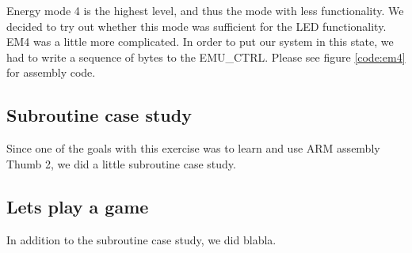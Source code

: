 		Energy mode 4 is the highest level, and thus the mode with less functionality. We decided to try out whether this mode was sufficient for the LED functionality. EM4 was a little more complicated. In order to put our system in this state, we had to write a sequence of bytes to the EMU\_CTRL. Please see figure \ref{code:em4} for assembly code.

	
	\subsection{Subroutine case study}
	Since one of the goals with this exercise was to learn and use ARM assembly Thumb 2, we did a little subroutine case study.

	\subsection{Lets play a game}
	In addition to the subroutine case study, we did blabla.

